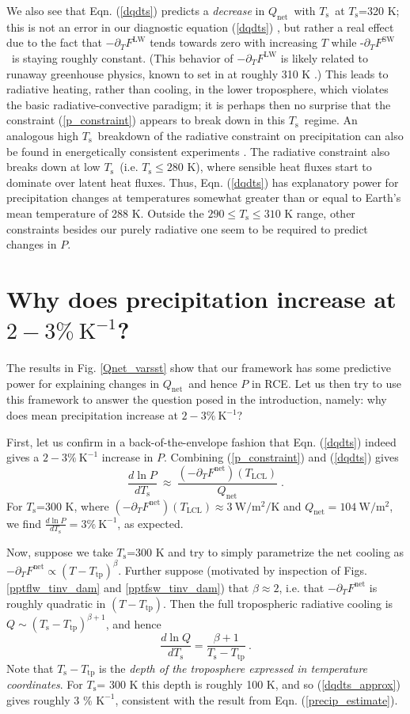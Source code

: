 \documentclass[10pt]{article}
\newcommand{\beqn}{\begin{equation}}
\newcommand{\eeqn}{\end{equation}}
\newcommand{\eqnref}[1]{(\ref{#1})}
\newcommand{\ppt}{\ensuremath{\partial_T}}
\newcommand{\Qnet}{\ensuremath{Q_\mathrm{net}}}
\newcommand{\FLW}{\ensuremath{F^\mathrm{LW}}}
\newcommand{\FSW}{\ensuremath{F^\mathrm{SW}}}
\newcommand{\Fnet}{\ensuremath{F^\mathrm{net}}}
\newcommand{\Wmsq}{\ensuremath{\mathrm{W/m^2}}}
\newcommand{\Ts}{\ensuremath{T_\mathrm{s}}}
\newcommand{\Tlcl}{\ensuremath{T_\mathrm{LCL}}}
\newcommand{\Ttp}{\ensuremath{T_\mathrm{tp}}}
\newcommand{\Kinverse}{\ensuremath{\mathrm{K^{-1}}}}
\begin{document}
We also see that  Eqn. \eqnref{dqdts} predicts a \emph{decrease} in  \Qnet\ with \Ts\ at \Ts=320 K; this is not an error in our diagnostic equation \eqnref{dqdts} , but rather a real effect due to the fact that $-\ppt \FLW$ tends towards zero with increasing $T$  while -\ppt \FSW\ is staying roughly constant. (This behavior of $-\ppt \FLW$ is likely related to runaway greenhouse physics, known to set in at roughly 310 K \citep{goldblatt2013}.) This leads to radiative heating, rather than cooling, in the  lower troposphere, which violates the basic radiative-convective paradigm; it is perhaps then no surprise that the constraint \eqnref{p_constraint} appears to break down in this \Ts\ regime. An analogous high \Ts\ breakdown of the radiative constraint on precipitation can also be found in energetically consistent experiments \citep{lehir2009, pierrehumbert1999}.  The radiative  constraint  also breaks down at low \Ts\ (i.e. $\Ts \leq 280$ K), where sensible heat fluxes start to dominate over latent heat fluxes. Thus, Eqn. \eqnref{dqdts} has explanatory power for  precipitation changes at  temperatures somewhat greater than or equal to Earth's mean temperature of 288 K. Outside the $290\leq \Ts \leq 310$ K range, other constraints besides our purely radiative one seem to be required to predict changes in $P$.


\section{Why does precipitation increase at $2 -3\%\ \Kinverse$?} \label{sec_1percent}
The results in Fig. \ref{Qnet_varsst} show that our framework  has some predictive power for explaining changes in \Qnet\ and hence $P$ in RCE. Let us then try to use this framework to answer the question posed in the introduction, namely: why does mean precipitation increase at $2 -3\%\ \Kinverse$?

First, let us confirm in a back-of-the-envelope fashion that Eqn. \eqnref{dqdts} indeed gives a $2 -3\%\ \Kinverse$ increase in $P$. Combining \eqnref{p_constraint} and \eqnref{dqdts} gives
	\beqn
		\frac{d \ln  P}{d \Ts} \ \approx\  \frac{(-\ppt \Fnet)(\Tlcl)}{\Qnet} \; .
	\label{precip_estimate}
	\eeqn
For \Ts=300 K, where $(-\ppt \Fnet)(\Tlcl) \approx 3 \ \Wmsq/\mathrm{K}$ and $\Qnet =  104\ \Wmsq$, we find $\frac{d \ln  P}{d \Ts}=  3\%\ \Kinverse$, as expected.

Now, suppose we take \Ts=300 K and  try to simply parametrize the net cooling as $-\ppt \Fnet \propto (T-\Ttp)^\beta$.  Further suppose (motivated by inspection of Figs. \ref{pptflw_tinv_dam} and \ref{pptfsw_tinv_dam})  that $\beta \approx 2$, i.e. that $-\ppt \Fnet$ is roughly quadratic  in $(T-\Ttp)$. Then the full tropospheric radiative cooling is $Q\sim (\Ts-\Ttp)^{\beta+1}$, and hence 
	\beqn
		\frac{d \ln Q}{d \Ts}  =  \frac{\beta+1}{\Ts-\Ttp}\ . \label{dqdts_approx}
	\eeqn
Note that $\Ts-\Ttp$ is the \emph{depth of the troposphere expressed in temperature coordinates}. For  \Ts= 300 K this depth is roughly 100 K, and so \eqnref{dqdts_approx} gives roughly 3 \% \Kinverse, consistent with the result from Eqn. \eqnref{precip_estimate}.
\end{document}
